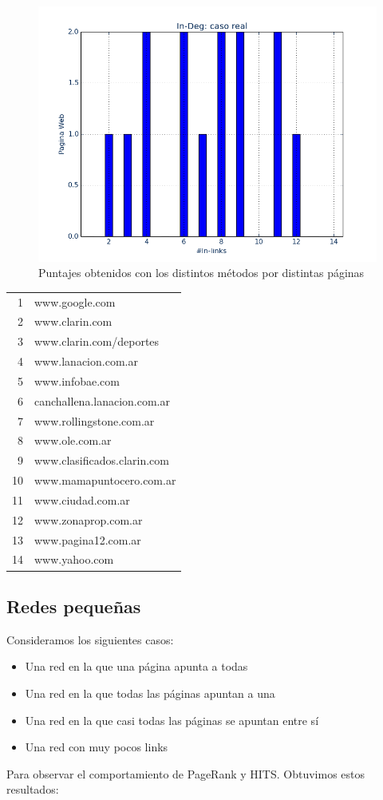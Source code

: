 \documentclass[a4paper]{article}
\begin{document}
\begin{figure}[htbp]
\includegraphics[scale=0.25]{img/casorealIn-Deg.png}
\caption{Puntajes obtenidos con los distintos métodos por distintas páginas}
\end{figure}

\begin{tabular}{r|l}
1 & www.google.com\\
2 & www.clarin.com\\
3 & www.clarin.com/deportes\\
4 & www.lanacion.com.ar\\
5 & www.infobae.com\\
6 & canchallena.lanacion.com.ar\\
7 & www.rollingstone.com.ar\\
8 & www.ole.com.ar \\
9 & www.clasificados.clarin.com\\
10 & www.mamapuntocero.com.ar\\
11 & www.ciudad.com.ar\\
12 & www.zonaprop.com.ar\\
13 & www.pagina12.com.ar\\
14 & www.yahoo.com\\
\end{tabular}

\subsection{Redes pequeñas}
Consideramos los siguientes casos:
\begin{itemize}
\item Una red en la que una página apunta a todas
\item Una red en la que todas las páginas apuntan a una
\item Una red en la que casi todas las páginas se apuntan entre sí
\item Una red con muy pocos links
\end{itemize}
Para observar el comportamiento de PageRank y HITS. Obtuvimos estos resultados:
\end{document}
